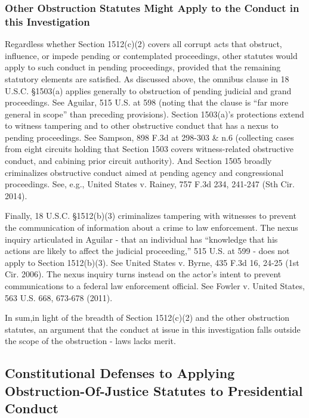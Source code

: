 \subsubsection{Other Obstruction Statutes Might Apply to the Conduct in this Investigation}

Regardless whether Section 1512(c)(2) covers all corrupt acts that obstruct, influence, or impede pending or contemplated proceedings, other statutes would apply to such conduct in pending proceedings, provided that the remaining statutory elements are satisfied.
As discussed above, the omnibus clause in 18 U.S.C. \S 1503(a) applies generally to obstruction of pending judicial and grand proceedings.%
See Aguilar, 515 U.S. at 598 (noting that the clause is “far more general in scope” than preceding provisions).
Section 1503(a)’s protections extend to witness tampering and to other obstructive conduct that has a nexus to pending proceedings.
See Sampson, 898 F.3d at 298-303 & n.6 (collecting cases from eight circuits holding that Section 1503 covers witness-related obstructive conduct, and cabining prior circuit authority).
And Section 1505 broadly criminalizes obstructive conduct aimed at pending agency and congressional proceedings.%
See, e.g., United States v. Rainey, 757 F.3d 234, 241-247 (Sth Cir. 2014).

Finally, 18 U.S.C. \S 1512(b)(3) criminalizes tampering with witnesses to prevent the communication of information about a crime to law enforcement.
The nexus inquiry articulated in Aguilar - that an individual has “knowledge that his actions are likely to affect the judicial proceeding,” 515 U.S. at 599 - does not apply to Section 1512(b)(3).
See United States v. Byrne, 435 F.3d 16, 24-25 (1st Cir. 2006).
The nexus inquiry turns instead on the actor’s intent to prevent communications to a federal law enforcement official. See Fowler v. United States, 563 U.S. 668, 673-678 (2011).

\hr

In sum,in light of the breadth of Section 1512(c)(2) and the other obstruction statutes, an argument that the conduct at issue in this investigation falls outside the scope of the obstruction - laws lacks merit.

\subsection{Constitutional Defenses to Applying Obstruction-Of-Justice Statutes to Presidential Conduct}

